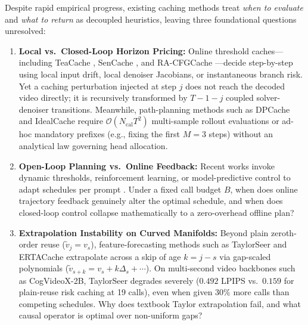 Despite rapid empirical progress, existing caching methods treat \emph{when to evaluate} and \emph{what to return} as decoupled heuristics, leaving three foundational questions unresolved:
\begin{enumerate}
\item \textbf{Local vs.\ Closed-Loop Horizon Pricing:} Online threshold caches---including TeaCache \citep{liu2025teacache}, SenCache \citep{haghighi2026sencache}, and RA-CFGCache \citep{liu2026racfgcache}---decide step-by-step using local input drift, local denoiser Jacobians, or instantaneous branch risk. Yet a caching perturbation injected at step $j$ does not reach the decoded video directly; it is recursively transformed by $T - 1 - j$ coupled solver-denoiser transitions. Meanwhile, path-planning methods such as DPCache \citep{cui2026dpcache} and IdealCache \citep{xue2026idealcache} require $\mathcal{O}(N_{\mathrm{cal}} T^2)$ multi-sample rollout evaluations or ad-hoc mandatory prefixes (e.g., fixing the first $M=3$ steps) without an analytical law governing head allocation.
\item \textbf{Open-Loop Planning vs.\ Online Feedback:} Recent works invoke dynamic thresholds, reinforcement learning, or model-predictive control to adapt schedules per prompt \citep{haghighi2026sencache,li2026racer}. Under a fixed call budget $B$, when does online trajectory feedback genuinely alter the optimal schedule, and when does closed-loop control collapse mathematically to a zero-overhead offline plan?
\item \textbf{Extrapolation Instability on Curved Manifolds:} Beyond plain zeroth-order reuse ($\tilde{v}_j = v_s$), feature-forecasting methods such as TaylorSeer \citep{liu2025taylorseer} and ERTACache \citep{peng2025ertacache} extrapolate across a skip of age $k = j - s$ via gap-scaled polynomials ($\tilde{v}_{s+k} = v_s + k \Delta_s + \cdots$). On multi-second video backbones such as CogVideoX-2B, TaylorSeer degrades severely ($0.492$ LPIPS vs.\ $0.159$ for plain-reuse risk caching at 19 calls), even when given $30\%$ more calls than competing schedules. Why does textbook Taylor extrapolation fail, and what causal operator is optimal over non-uniform gaps?
\end{enumerate}

